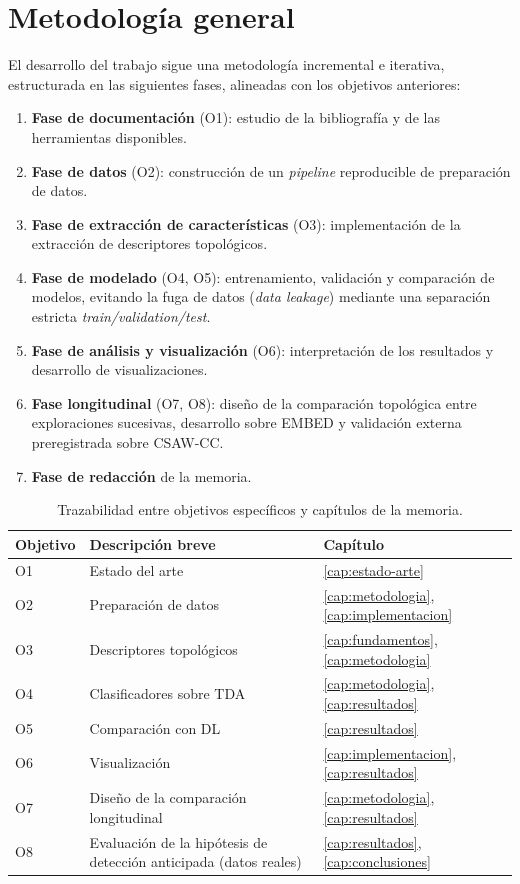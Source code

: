 \section{Metodología general}
El desarrollo del trabajo sigue una metodología incremental e iterativa,
estructurada en las siguientes fases, alineadas con los objetivos anteriores:

\begin{enumerate}
  \item \textbf{Fase de documentación} (O1): estudio de la bibliografía y de las
        herramientas disponibles.
  \item \textbf{Fase de datos} (O2): construcción de un \textit{pipeline}
        reproducible de preparación de datos.
  \item \textbf{Fase de extracción de características} (O3): implementación de la
        extracción de descriptores topológicos.
  \item \textbf{Fase de modelado} (O4, O5): entrenamiento, validación y
        comparación de modelos, evitando la fuga de datos (\textit{data
        leakage}) mediante una separación estricta \textit{train/validation/test}.
  \item \textbf{Fase de análisis y visualización} (O6): interpretación de los
        resultados y desarrollo de visualizaciones.
  \item \textbf{Fase longitudinal} (O7, O8): diseño de la comparación
        topológica entre exploraciones sucesivas, desarrollo sobre EMBED y
        validación externa preregistrada sobre CSAW-CC.
  \item \textbf{Fase de redacción} de la memoria.
\end{enumerate}

\begin{table}[H]
\centering
\caption{Trazabilidad entre objetivos específicos y capítulos de la memoria.}
\label{tab:trazabilidad}
\small
\begin{tabular}{@{}lll@{}}
\toprule
\textbf{Objetivo} & \textbf{Descripción breve} & \textbf{Capítulo} \\
\midrule
O1 & Estado del arte            & \ref{cap:estado-arte} \\
O2 & Preparación de datos       & \ref{cap:metodologia}, \ref{cap:implementacion} \\
O3 & Descriptores topológicos   & \ref{cap:fundamentos}, \ref{cap:metodologia} \\
O4 & Clasificadores sobre TDA   & \ref{cap:metodologia}, \ref{cap:resultados} \\
O5 & Comparación con DL         & \ref{cap:resultados} \\
O6 & Visualización              & \ref{cap:implementacion}, \ref{cap:resultados} \\
O7 & Diseño de la comparación longitudinal & \ref{cap:metodologia}, \ref{cap:resultados} \\
O8 & Evaluación de la hipótesis de detección anticipada (datos reales) & \ref{cap:resultados}, \ref{cap:conclusiones} \\
\bottomrule
\end{tabular}
\end{table}
